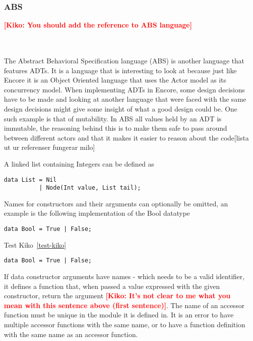 \documentclass[10pt]{report}
\newcommand{\KIKO}[1]{\textcolor{red}{\textbf{[Kiko: #1]}}}
\begin{document}
\subsubsection{ABS}
\KIKO{You should add the reference to ABS language}
\par{\noindent \\\\The Abstract Behavioral Specification language (ABS) is another language that features ADTs. It is a language that is interesting to look at because just like Encore it is an Object Oriented language that uses the Actor model as its concurrency model. When implementing ADTs in Encore, some design decisions have to be made and looking at another language that were faced with the same design decisions might give some insight of what a good design could be. One such example is that of mutability. In ABS all values held by an ADT is immutable, the reasoning behind this is to make them safe to pass around between different actors and that it makes it easier to reason about the code[lista ut ur referenser fungerar milo]\\}
\par{\noindent A linked list containing Integers can be defined as\\}
\begin{lstlisting}[language=encore,caption={Linked list in ABS}]
data List = Nil
          | Node(Int value, List tail);
\end{lstlisting}
\par{\noindent Names for constructors and their arguments can optionally be omitted, an example is the following implementation of the Bool datatype\\}

\begin{lstlisting}[language=encore,caption={Actual definition of built-in type Bool},label=test-kiko]
data Bool = True | False;
\end{lstlisting}
Test Kiko~\ref{test-kiko}

\begin{lstlisting}[language=encore,caption={Actual definition of built-in type Bool}]
data Bool = True | False;
\end{lstlisting}
\par{\noindent If data constructor arguments have names - which needs to be a valid identifier, it defines a function that, when passed a value expressed with the given constructor, return the argument \KIKO{It's not clear to me what you mean with this sentence above (first sentence)}.  The name of an accessor function must be unique in the module it is defined in. It is an error to have multiple accessor functions with the same name, or to have a function definition with the same name as an accessor function.\\}
\end{document}
